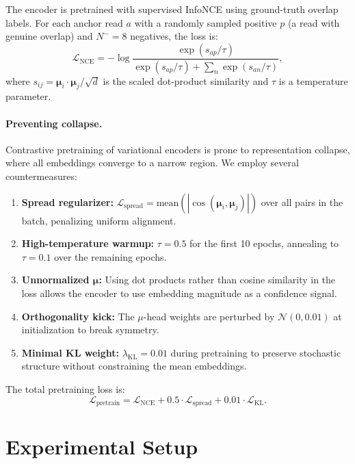 \documentclass[11pt,a4paper]{article}
\newcommand{\bmu}{\boldsymbol{\mu}}
\newcommand{\KL}{\mathrm{KL}}
\begin{document}
The encoder is pretrained with supervised InfoNCE
\citep{oord2018representation} using ground-truth overlap labels.  For
each anchor read $a$ with a randomly sampled positive $p$ (a read
with genuine overlap) and $N^{-} = 8$ negatives, the loss is:
\begin{equation}
  \mathcal{L}_{\mathrm{NCE}}
    = -\log \frac{\exp(s_{ap} / \tau)}
                 {\exp(s_{ap} / \tau) + \sum_{n} \exp(s_{an} / \tau)},
\end{equation}
where $s_{ij} = \bmu_i \cdot \bmu_j / \sqrt{d}$ is the scaled
dot-product similarity and $\tau$ is a temperature parameter.

\paragraph{Preventing collapse.}
Contrastive pretraining of variational encoders is prone to
representation collapse, where all embeddings converge to a narrow
region.  We employ several countermeasures:
\begin{enumerate}
  \item \textbf{Spread regularizer:} $\mathcal{L}_{\mathrm{spread}}
    = \mathrm{mean}(|\cos(\bmu_i, \bmu_j)|)$ over all pairs in the
    batch, penalizing uniform alignment.
  \item \textbf{High-temperature warmup:} $\tau = 0.5$ for the first
    10 epochs, annealing to $\tau = 0.1$ over the remaining epochs.
  \item \textbf{Unnormalized $\bmu$:} Using dot products rather than
    cosine similarity in the loss allows the encoder to use embedding
    magnitude as a confidence signal.
  \item \textbf{Orthogonality kick:} The $\mu$-head weights are
    perturbed by $\mathcal{N}(0, 0.01)$ at initialization to break
    symmetry.
  \item \textbf{Minimal KL weight:} $\lambda_{\KL} = 0.01$ during
    pretraining to preserve stochastic structure without constraining
    the mean embeddings.
\end{enumerate}
The total pretraining loss is:
\begin{equation}
  \mathcal{L}_{\mathrm{pretrain}}
    = \mathcal{L}_{\mathrm{NCE}}
    + 0.5 \cdot \mathcal{L}_{\mathrm{spread}}
    + 0.01 \cdot \mathcal{L}_{\KL}.
\end{equation}


\section{Experimental Setup}
\label{sec:experiments}
\end{document}
